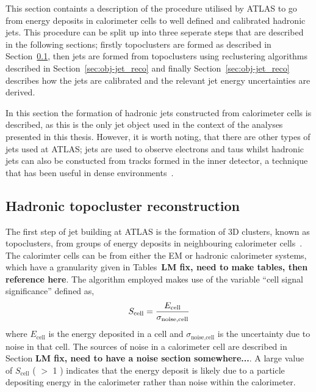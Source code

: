 This section containts a description of the procedure utilised by ATLAS
to go from energy deposits in calorimeter cells to well defined and calibrated hadronic jets.
This procedure can be split up into three seperate steps that are described in the following sections;
firstly topoclusters are formed as described in Section~\ref{sec:obj-jet_topo},
then jets are formed from topoclusters using reclustering algorithms described in Section~\ref{sec:obj-jet_reco}
and finally Section~\ref{sec:obj-jet_reco} describes how the jets are calibrated and the relevant jet energy uncertainties are derived.

In this section the formation of hadronic jets constructed from calorimeter cells is described,
as this is the only jet object used in the context of the analyses presented in this thesis.
However, it is worth noting, that there are other types of jets used at ATLAS;
jets are used to observe electrons and taus whilst
hadronic jets can also be constucted from tracks formed in the inner detector, a technique that has been useful in dense environments~\cite{obj-Hbb}.

\subsection{Hadronic topocluster reconstruction}
\label{sec:obj-jet_topo}

The first step of jet building at ATLAS is the formation of 3D clusters, known as topoclusters, from groups of energy deposits in neighbouring calorimeter cells~\cite{obj-jet_topo}.
The calorimter cells can be from either the EM or hadronic calorimeter systems,
which have a granularity given in Tables~\textbf{LM fix, need to make tables, then reference here}.
The algorithm employed makes use of the variable ``cell signal significance'' defined as, 
\begin{equation}
  \Large{S_{\text{cell}} = \frac{E_{\text{cell}}}{\sigma_{\text{noise,cell}}}}
\end{equation}
where $E_{\text{cell}}$ is the energy deposited in a cell
and $\sigma_{\text{noise,cell}}$ is the uncertainty due to noise in that cell.
The sources of noise in a calorimeter cell are described in Section \textbf{LM fix, need to have a noise section somewhere...}.
A large value of $S_{\text{cell}}$ ( $>$ 1 ) indicates that the energy deposit is likely due to a particle
depositing energy in the calorimeter rather than noise within the calorimeter.

